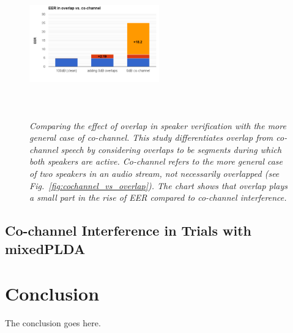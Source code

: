 \documentclass[journal]{IEEEtran}
\begin{document}
\begin{figure}[h!]
	\vspace{-1mm}
	\includegraphics[height = 2.5in, width=0.5\textwidth]{figures/overlap_vs_cochannel_sid-crop}
	\vspace{-8mm}
	\caption{\it \small Comparing the effect of overlap in speaker verification with the more general case of co-channel. This study differentiates overlap from co-channel speech by considering overlaps to be segments during which both speakers are active. Co-channel refers to the more general case of two speakers in an audio stream, not necessarily overlapped (see Fig.~\ref{fig:cochannel_vs_overlap}). The chart shows that overlap plays a small part in the rise of EER compared to co-channel interference.}
	\label{fig:ovl_in_sid}
	\vspace{-1mm}
\end{figure}

\subsection{Co-channel Interference in Trials with mixedPLDA} 
\label{ssec:mixedplda_exp}


\section{Conclusion}
The conclusion goes here.





\ifCLASSOPTIONcaptionsoff
  \newpage
\fi



\end{document}
